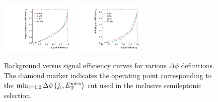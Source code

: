 \begin{figure}[htbp]
  \centering
  \includegraphics[width=0.32\textwidth]{figures/ttdm1_vs_wjets-semilept-roc.pdf}
  \includegraphics[width=0.32\textwidth]{figures/ttdm1_vs_ttbar-semilept-roc.pdf}
  \caption{Background versus signal efficiency curves for various $\Delta\phi$ definitions. The diamond marker indicates the operating point corresponding to the $\min_{i=1,2}\Delta\phi\left(j_i,E_\mathrm{T}^{\mathrm{miss}}\right)$ cut used in the inclusive semileptonic selection.}
  \label{fig:semilept_dphijetmet_roc}
\end{figure}
